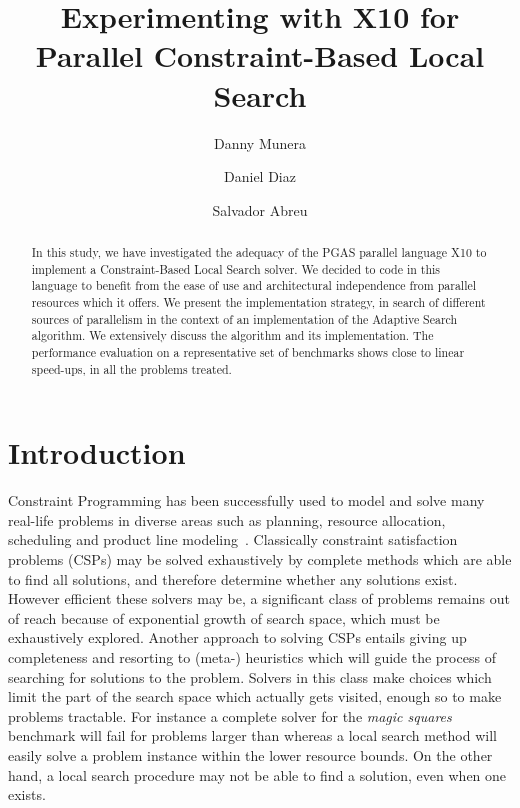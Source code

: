 \documentclass{llncs}
\begin{document}
\title{Experimenting with X10 for Parallel Constraint-Based Local Search}


\author{Danny Munera \and Daniel Diaz \and Salvador Abreu}


\maketitle

\begin{abstract}
In this study, we have investigated the adequacy of the PGAS
  parallel language X10 to implement a Constraint-Based Local Search
  solver.  We decided to code in this language to benefit from the
  ease of use and architectural independence from parallel resources
  which it offers.  We present the implementation strategy, in search
  of different sources of parallelism in the context of an
  implementation of the Adaptive Search algorithm.  We extensively
  discuss the algorithm and its implementation.  The performance
  evaluation on a representative set of benchmarks shows close to
  linear speed-ups, in all the problems treated.
\end{abstract}

\section{Introduction}

Constraint Programming has been successfully used to model and solve
many real-life problems in diverse areas such as planning, resource
allocation, scheduling and product line
modeling~\cite{Rossi2006,Salinesi}.  Classically constraint
satisfaction problems (CSPs) may be solved exhaustively by complete
methods which are able to find all solutions, and therefore determine
whether any solutions exist.  However efficient these solvers may be,
a significant class of problems remains out of reach because of
exponential growth of search space, which must be exhaustively
explored. 
Another approach to solving CSPs entails giving up completeness and
resorting to (meta-) heuristics which will guide the process of
searching for solutions to the problem.  Solvers in this class make
choices which limit the part of the search space which actually gets
visited, enough so to make problems tractable.  For instance a
complete solver for the \emph{magic squares} benchmark will fail for
problems larger than  whereas a local search method will
easily solve a  problem instance within the lower
resource bounds.  On the other hand, a local search procedure may not
be able to find a solution, even when one exists.
\end{document}
